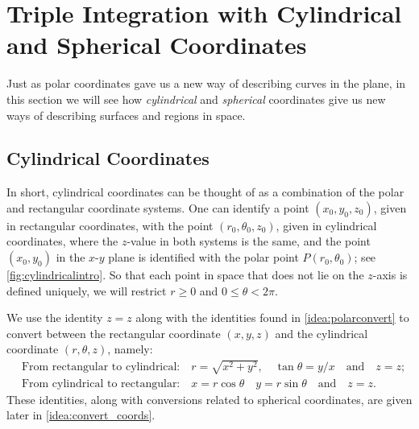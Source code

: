 \section{Triple Integration with Cylindrical and Spherical Coordinates}\label{sec:cylindrical_spherical}

Just as polar coordinates gave us a new way of describing curves in the plane, in this section we will see how \emph{cylindrical} and \emph{spherical} coordinates give us new ways of describing surfaces and regions in space.


\subsection{Cylindrical Coordinates}

In short, cylindrical coordinates can be thought of as a combination of the polar and rectangular coordinate systems. %
One can identify a point $(x_0,y_0,z_0)$, given in rectangular coordinates, with the point $(r_0,\theta_0,z_0)$, given in cylindrical coordinates, where the $z$-value in both systems is the same, and the point $(x_0,y_0)$ in the $x$-$y$ plane is identified with the polar point $P(r_0,\theta_0)$; see \autoref{fig:cylindricalintro}. So that each point in space that does not lie on the $z$-axis is defined uniquely, we will restrict $r\geq 0$ and $0\leq \theta< 2\pi$.

We use the identity $z=z$ along with the identities found in \autoref{idea:polarconvert} to convert between the  rectangular coordinate $(x,y,z)$ and the  cylindrical coordinate $(r,\theta,z)$, namely:
\begin{align*}
&\text{From rectangular to cylindrical:}\quad r=\sqrt{x^2+y^2},\quad \tan\theta = y/x \quad\text{and}\quad z=z;\\
&\text{From cylindrical to rectangular:} \quad x=r\cos\theta\quad y=r\sin\theta\quad \text{and}\quad z=z.
\end{align*}
These identities, along with conversions related to spherical coordinates, are given later in \autoref{idea:convert_coords}.


